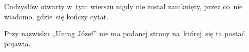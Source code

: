 \documentclass[a4paper,11pt]{article}
\numberwithin{equation}{section}
\begin{document}
\VerSpaceFour





 Cudzysłów otwarty w~tym wierszu nigdy nie został
zamknięty, przez co~nie wiadomo, gdzie~się kończy cytat.

\VerSpaceFour





 Przy nazwisku „Unrag Józef” nie ma podanej
strony na~której~się ta postać pojawia.

\VerSpaceFour







\begin{center}


\end{center}
\end{document}

